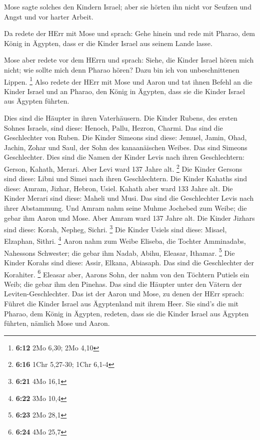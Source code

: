  Mose sagte solches den Kindern Israel; aber sie hörten ihn
nicht vor Seufzen und Angst und vor harter Arbeit.

 Da redete der HErr mit Mose und sprach:  Gehe
hinein und rede mit Pharao, dem König in Ägypten, dass er die Kinder
Israel aus seinem Lande lasse.

 Mose aber redete vor dem HErrn und sprach: Siehe, die
Kinder Israel hören mich nicht; wie sollte mich denn Pharao hören? Dazu
bin ich von unbeschnittenen Lippen. \footnote{\textbf{6:12} 2Mo 6,30;
  2Mo 4,10}  Also redete der HErr mit Mose und Aaron und
tat ihnen Befehl an die Kinder Israel und an Pharao, den König in
Ägypten, dass sie die Kinder Israel aus Ägypten führten.

 Dies sind die Häupter in ihren Vaterhäusern. Die Kinder
Rubens, des ersten Sohnes Israels, sind diese: Henoch, Pallu, Hezron,
Charmi. Das sind die Geschlechter von Ruben.  Die Kinder
Simeons sind diese: Jemuel, Jamin, Ohad, Jachin, Zohar und Saul, der
Sohn des kanaanäischen Weibes. Das sind Simeons Geschlechter.
 Dies sind die Namen der Kinder Levis nach ihren
Geschlechtern: Gerson, Kahath, Merari. Aber Levi ward 137 Jahre alt.
\footnote{\textbf{6:16} 1Chr 5,27-30; 1Chr 6,1-4}  Die
Kinder Gersons sind diese: Libni und Simei nach ihren Geschlechtern.
 Die Kinder Kahaths sind diese: Amram, Jizhar, Hebron,
Usiel. Kahath aber ward 133 Jahre alt.  Die Kinder Merari
sind diese: Maheli und Musi. Das sind die Geschlechter Levis nach ihrer
Abstammung.  Und Amram nahm seine Muhme Jochebed zum Weibe;
die gebar ihm Aaron und Mose. Aber Amram ward 137 Jahre alt.
 Die Kinder Jizhars sind diese: Korah, Nepheg, Sichri.
\footnote{\textbf{6:21} 4Mo 16,1}  Die Kinder Usiels sind
diese: Misael, Elzaphan, Sithri. \footnote{\textbf{6:22} 3Mo 10,4}
 Aaron nahm zum Weibe Eliseba, die Tochter Amminadabs,
Nahessons Schwester; die gebar ihm Nadab, Abihu, Eleasar, Ithamar.
\footnote{\textbf{6:23} 2Mo 28,1}  Die Kinder Korahs sind
diese: Assir, Elkana, Abiasaph. Das sind die Geschlechter der Korahiter.
\footnote{\textbf{6:24} 4Mo 25,7}  Eleasar aber, Aarons
Sohn, der nahm von den Töchtern Putiels ein Weib; die gebar ihm den
Pinehas. Das sind die Häupter unter den Vätern der Leviten-Geschlechter.
 Das ist der Aaron und Mose, zu denen der HErr sprach:
Führet die Kinder Israel aus Ägyptenland mit ihrem Heer. 
Sie sind's die mit Pharao, dem König in Ägypten, redeten, dass sie die
Kinder Israel aus Ägypten führten, nämlich Mose und Aaron.

